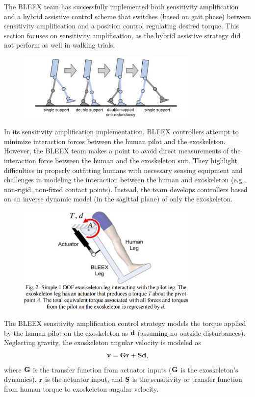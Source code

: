 \begin{refsection}
The BLEEX team has successfully implemented both sensitivity amplification \cite{sesitivityAmpPaper2005} and a hybrid assistive control scheme \cite{bleex_hybrid_control_2006} that switches (based on gait phase) between sensitivity amplification and a position control regulating desired torque. This section focuses on sensitivity amplification, as the hybrid assistive strategy did not perform as well in walking trials.

\begin{figure}[ht]
  \centering
  \includegraphics[width=3.5in]{exos/figs/bleex_support_phases.png}
\end{figure}

In its sensitivity amplification implementation, BLEEX controllers attempt to minimize interaction forces between the human pilot and the exoskeleton. However, the BLEEX team makes a point to avoid direct measurements of the interaction force between the human and the exoskeleton suit.  They highlight difficulties in properly outfitting humans with necessary sensing equipment and challenges in modeling the interaction between the human and exoskeleton (e.g., non-rigid, non-fixed contact points).  Instead, the team develops controllers based on an inverse dynamic model (in the sagittal plane) of only the exoskeleton.  

\begin{figure}[ht]
  \centering
  \includegraphics[width=3.5in]{exos/figs/bleex_1dof_ex.png}
\end{figure}

The BLEEX sensitivity amplification control strategy models the torque applied by the human pilot on the exoskeleton as ${\bf d}$ (assuming no outside disturbances).   Neglecting gravity, the exoskeleton angular velocity is modeled as 
\[{\bf v} = {\bf G} {\bf r} + {\bf S} {\bf d} ,\] 
where ${\bf G}$ is the transfer function from actuator inputs (${\bf G}$ is the exoskeleton's dynamics), ${\bf r}$ is the actuator input, and ${\bf S}$ is the sensitivity or transfer function from human torque to exoskeleton angular velocity. 


\end{refsection}
